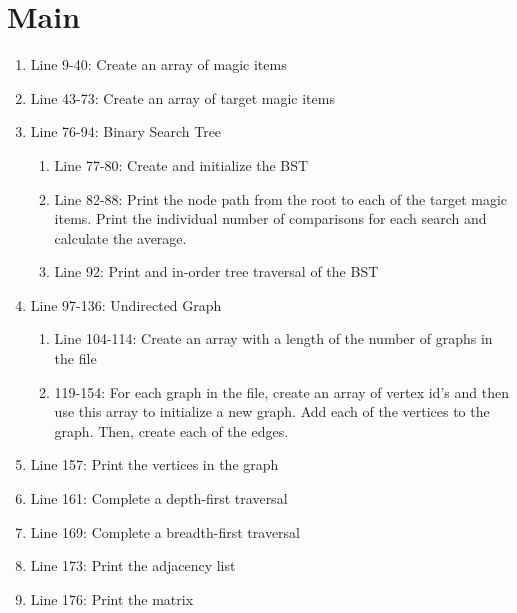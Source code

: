 \documentclass[letterpaper, 10pt,DIV=13]{scrartcl}
\numberwithin{equation}{section} %
\numberwithin{figure}{section} %
\numberwithin{table}{section} %
\begin{document}
\section{Main}

\begin{enumerate}
    \item Line 9-40: Create an array of magic items
    \item Line 43-73: Create an array of target magic items
    \item Line 76-94: Binary Search Tree
    \begin{enumerate}
        \item Line 77-80: Create and initialize the BST
        \item Line 82-88: Print the node path from the root to each of the target magic items. Print the individual number of comparisons for each search and calculate the average.
        \item Line 92: Print and in-order tree traversal of the BST
    \end{enumerate}
    \item Line 97-136: Undirected Graph
    \begin{enumerate}
        \item Line 104-114: Create an array with a length of the number of graphs in the file
        \item 119-154: For each graph in the file, create an array of vertex id's and then use this array to initialize a new graph. Add each of the vertices to the graph. Then, create each of the edges.
    \end{enumerate}
    \item Line 157: Print the vertices in the graph
    \item Line 161: Complete a depth-first traversal
    \item Line 169: Complete a breadth-first traversal
    \item Line 173: Print the adjacency list
    \item Line 176: Print the matrix
\end{enumerate}
\end{document}
